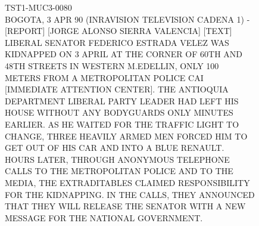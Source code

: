 \documentclass[PhD-Yoann-Dupont.tex]{subfiles}
\begin{document}
\begin{figure}[ht!]
\footnotesize
\begin{tcolorbox}[fonttitle=\bfseries,title=Message]
\begin{helvetica}
TST1-MUC3-0080\\

BOGOTA, 3 APR 90 (INRAVISION TELEVISION CADENA 1) - [REPORT] [JORGE ALONSO SIERRA VALENCIA] [TEXT] LIBERAL SENATOR FEDERICO ESTRADA VELEZ WAS KIDNAPPED ON 3 APRIL AT THE CORNER OF 60TH AND 48TH STREETS IN WESTERN M.EDELLIN, ONLY 100 METERS FROM A METROPOLITAN POLICE CAI [IMMEDIATE ATTENTION CENTER]. THE ANTIOQUIA DEPARTMENT LIBERAL PARTY LEADER HAD LEFT HIS HOUSE WITHOUT ANY BODYGUARDS ONLY MINUTES EARLIER. AS HE WAITED FOR THE TRAFFIC LIGHT TO CHANGE, THREE HEAVILY ARMED MEN FORCED HIM TO GET OUT OF HIS CAR AND INTO A BLUE RENAULT.\\

HOURS LATER, THROUGH ANONYMOUS TELEPHONE CALLS TO THE METROPOLITAN POLICE AND TO THE MEDIA, THE EXTRADITABLES CLAIMED RESPONSIBILITY FOR THE KIDNAPPING. IN THE CALLS, THEY ANNOUNCED THAT THEY WILL RELEASE THE SENATOR WITH A NEW MESSAGE FOR THE NATIONAL GOVERNMENT.\\


\end{helvetica}
\end{tcolorbox}
\end{figure}
\end{document}
